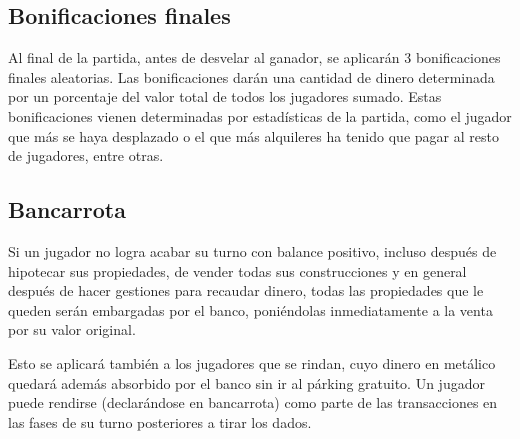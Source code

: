 \subsection{Bonificaciones finales}
Al final de la partida, antes de desvelar al ganador, se aplicarán 3
bonificaciones finales aleatorias. Las bonificaciones darán una cantidad
de dinero determinada por un porcentaje del valor total de todos los jugadores 
sumado.
Estas bonificaciones vienen determinadas por estadísticas de la partida,
como el jugador que más se haya desplazado o el que más alquileres ha 
tenido que pagar al resto de jugadores, entre otras.

\subsection{Bancarrota}
\label{sec:bancarrota}
Si un jugador no logra acabar su turno con balance positivo,
incluso después de hipotecar sus propiedades,
de vender todas sus construcciones y en general después de hacer 
gestiones para recaudar dinero,
todas las propiedades que le queden serán embargadas por el banco,
poniéndolas inmediatamente a la venta por su valor original.

Esto se aplicará también a los jugadores que se rindan, cuyo dinero en 
metálico quedará además absorbido por el banco sin ir al párking gratuito.
Un jugador puede rendirse (declarándose en bancarrota) como
parte de las transacciones en las fases de su turno posteriores a tirar los
dados.



